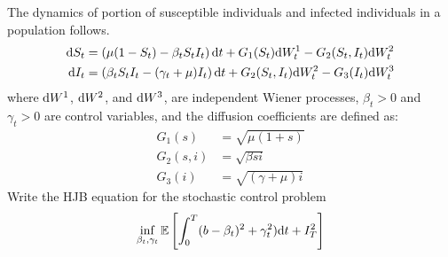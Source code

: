 \documentclass[11pt]{book}
\newcommand{\dd}{\text{\normalfont d}}
\newcommand{\dt}{\text{\normalfont d}t}
\newcommand{\dW}{\text{\normalfont d}W}
\begin{document}
\begin{ex}
The dynamics of portion of susceptible individuals and infected individuals in a population follows.
\begin{align*}
\dd{S}_t &= \left( \mu(1 - S_t) - \beta_t S_t I_t \right) \dt + G_1(S_t) \dW_t^{1}- G_2(S_t,I_t) \dW_t^{2} \\
\dd{I}_t &= \left( \beta_t S_t I_t - (\gamma_t + \mu)I_t \right) \dt + G_2(S_t,I_t)  \dW_t^{2} - G_3(I_t)  \dW_t^{3}
\end{align*}
where $\dW^1$, $\dW^2$, and $\dW^3$,  are independent Wiener processes, $\beta_t>0$ and $\gamma_t>0$ are control variables, and the diffusion coefficients are defined as:
\begin{align*}
G_1(s) &= \sqrt{\mu(1 + s)} \\
G_2(s,i) &= \sqrt{\beta s i} \\
G_3(i) &= \sqrt{(\gamma + \mu)i}
\end{align*}
Write the HJB equation for the stochastic control problem
\[
\inf_{\beta_t,\gamma_t}\mathbb{E}\left[\int_0^T (b-\beta_t)^2+\gamma_t^2 )\dt + I_T^2\right]
\]
\end{ex}
\end{document}
